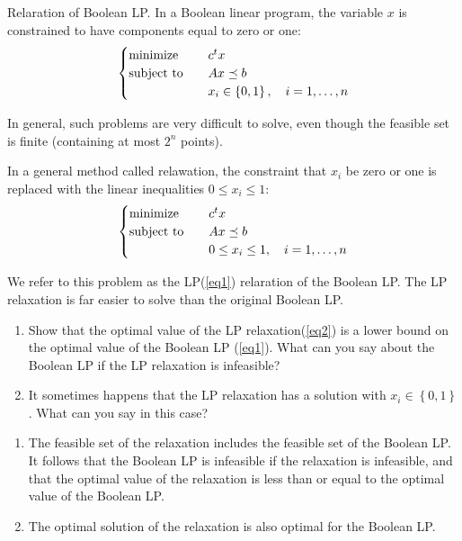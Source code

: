 \begin{problem}[4.15]
    Relaration of Boolean LP. In a Boolean linear program, the variable $x$ is constrained to have components equal to zero or one:\begin{equation}\label{eq1}
        \begin{cases}
            \operatorname{minimize} \quad &c^tx \\
            \operatorname{subject\ to} \quad &Ax \preceq b\\
            &x_i \in \left\{0, 1\right\}, \quad i = 1, \dots, n
        \end{cases}
    \end{equation}

    In general, such problems are very difficult to solve, even though the feasible set is finite (containing at most $2^n$ points).

    In a general method called relawation, the constraint that $x_i$ be zero or one is replaced with the linear inequalities $0 \le x_i \le 1$:\begin{equation}\label{eq2}
        \begin{cases}
            \operatorname{minimize} \quad &c^tx \\
            \operatorname{subject\ to} \quad &Ax \preceq b\\
            &0 \le x_i \le 1, \quad i = 1, \dots, n
        \end{cases}
    \end{equation}

    We refer to this problem as the LP(\ref{eq1}) relaration of the Boolean LP. The LP relaxation is far easier to solve than the original Boolean LP.
    \begin{enumerate}
        \item Show that the optimal value of the LP relaxation(\ref{eq2}) is a lower bound on the optimal value of the Boolean LP (\ref{eq1}). What can you say about the Boolean LP if the LP relaxation is infeasible?
        \item It sometimes happens that the LP relaxation has a solution with $x_i \in \left\{0, 1\right\}$. What can you say in this case?
    \end{enumerate}
    \Answer \text{}\begin{enumerate}
        \item The feasible set of the relaxation includes the feasible set of the Boolean LP. It follows that the Boolean LP is infeasible if the relaxation is infeasible, and that the optimal value of the relaxation is less than or equal to the optimal value of the Boolean LP.
        \item The optimal solution of the relaxation is also optimal for the Boolean LP.
    \end{enumerate}
\end{problem}

